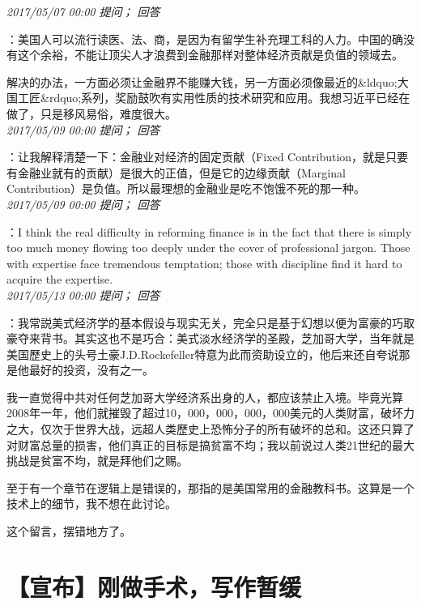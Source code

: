 \documentclass[twocolumn]{ctexart}
\begin{document}
\textit{\hfill\noindent\small 2017/05/07 00:00 提问； 回答}

：美国人可以流行读医、法、商，是因为有留学生补充理工科的人力。中国的确没有这个余裕，不能让顶尖人才浪费到金融那样对整体经济贡献是负值的领域去。

解决的办法，一方面必须让金融界不能赚大钱，另一方面必须像最近的\&ldquo;大国工匠\&rdquo;系列，奖励鼓吹有实用性质的技术研究和应用。我想习近平已经在做了，只是移风易俗，难度很大。\\

\textit{\hfill\noindent\small 2017/05/09 00:00 提问； 回答}

：让我解释清楚一下：金融业对经济的固定贡献（Fixed Contribution，就是只要有金融业就有的贡献）是很大的正值，但是它的边缘贡献（Marginal Contribution）是负值。所以最理想的金融业是吃不饱饿不死的那一种。\\

\textit{\hfill\noindent\small 2017/05/09 00:00 提问； 回答}

：I think the real difficulty in reforming finance is in the fact that there is simply too much money flowing too deeply under the cover of professional jargon. Those with expertise face tremendous temptation; those with discipline find it hard to acquire the expertise.\\

\textit{\hfill\noindent\small 2017/05/13 00:00 提问； 回答}

：我常説美式经济学的基本假设与现实无关，完全只是基于幻想以便为富豪的巧取豪夺来背书。其实这也不是巧合：美式淡水经济学的圣殿，芝加哥大学，当年就是美国歷史上的头号土豪J.D.Rockefeller特意为此而资助设立的，他后来还自夸说那是他最好的投资，没有之一。

我一直觉得中共对任何芝加哥大学经济系出身的人，都应该禁止入境。毕竟光算2008年一年，他们就摧毁了超过10，000，000，000，000美元的人类财富，破坏力之大，仅次于世界大战，远超人类歷史上恐怖分子的所有破坏的总和。这还只算了对财富总量的损害，他们真正的目标是搞贫富不均；我以前说过人类21世纪的最大挑战是贫富不均，就是拜他们之赐。

至于有一个章节在逻辑上是错误的，那指的是美国常用的金融教科书。这算是一个技术上的细节，我不想在此讨论。

这个留言，摆错地方了。\\


\section{【宣布】刚做手术，写作暂缓}
\end{document}
